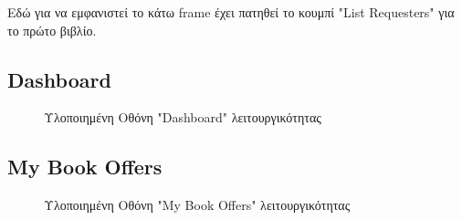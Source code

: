 \documentclass[12pt,a4paper]{article}
\begin{document}
Εδώ για να εμφανιστεί το κάτω frame έχει πατηθεί το κουμπί "List Requesters" για το πρώτο βιβλίο.

\subsection{Dashboard}

\begin{figure}[H]
	\caption{Υλοποιημένη Οθόνη "Dashboard" λειτουργικότητας}
	\label{Υλοποιημένη Οθόνη "Dashboard" λειτουργικότητας}
\end{figure}

\subsection{My Book Offers}

\begin{figure}[H]
	\caption{Υλοποιημένη Οθόνη "My Book Offers" λειτουργικότητας}
	\label{Υλοποιημένη Οθόνη "My Book Offers" λειτουργικότητας}
\end{figure}
\end{document}
